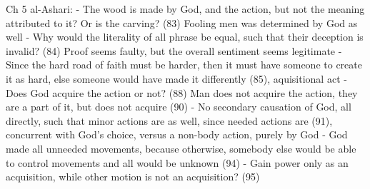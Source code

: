 \documentclass[11 pt, twoside]{article}
\begin{document}
Ch 5 al-Ashari:
- The wood is made by God, and the action, but not the meaning attributed to it? Or is the carving? (83) Fooling men was determined by God as well
	- Why would the literality of all phrase be equal, such that their deception is invalid? (84) Proof seems faulty, but the overall sentiment seems legitimate
- Since the hard road of faith must be harder, then it must have someone to create it as hard, else someone would have made it differently (85), aquisitional act
- Does God acquire the action or not? (88) Man does not acquire the action, they are a part of it, but does not acquire (90)
- No secondary causation of God, all directly, such that minor actions are as well, since needed actions are (91), concurrent with God's choice, versus a non-body action, purely by God
- God made all unneeded movements, because otherwise, somebody else would be able to control movements and all would be unknown (94)
	- Gain power only as an acquisition, while other motion is not an acquisition? (95)
\end{document}
